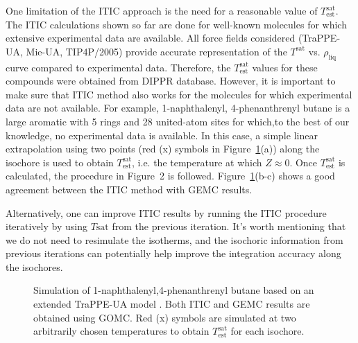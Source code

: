 \documentclass[5p,times]{elsarticle}
\begin{document}

One limitation of the ITIC approach is the need for a reasonable value of $T_\mathrm{est}^\mathrm{sat}$. The ITIC calculations shown so far are done for well-known molecules for which extensive experimental data are available. All force fields considered (TraPPE-UA, Mie-UA, TIP4P/2005) provide accurate representation of the $T^\mathrm{sat}$ vs. $\rho_\mathrm{liq}$ curve compared to experimental data. Therefore, the $T_\mathrm{est}^\mathrm{sat}$ values for these compounds were obtained from DIPPR database. However, it is important to make sure that ITIC method also works for the molecules for which experimental data are not available. For example, 1-naphthalenyl, 4-phenanthrenyl butane is a large aromatic with 5 rings and 28 united-atom sites for which,to the best of our knowledge, no experimental data is available. In this case, a simple linear extrapolation using two points (red (x) symbols in Figure~\ref{fig:Ex_Sim_TraPPE-1p4nB}(a)) along the isochore is used to obtain $T_\mathrm{est}^\mathrm{sat}$, i.e. the temperature at which $Z\approx0$. Once $T_\mathrm{est}^\mathrm{sat}$ is calculated, the procedure in Figure~2 is followed. Figure~\ref{fig:Ex_Sim_TraPPE-1p4nB}(b-c) shows a good agreement between the ITIC method with GEMC results.

Alternatively, one can improve ITIC results by running the ITIC procedure iteratively by using $T\mathrm{sat}$ from the previous iteration. It's worth mentioning that we do not need to resimulate the isotherms, and the isochoric information from previous iterations can potentially help improve the integration accuracy along the isochores. 



\begin{figure}[]
\centering
{}\label{cc}
\label{aa}
\label{bb}
\caption{
Simulation of 1-naphthalenyl,4-phenanthrenyl butane based on an extended TraPPE-UA model \cite{Yiannourakou2018}. Both ITIC and GEMC results are obtained using GOMC. Red (x) symbols are simulated at two arbitrarily chosen temperatures to obtain $T_\mathrm{est}^\mathrm{sat}$ for each isochore. 
}
\label{fig:Ex_Sim_TraPPE-1p4nB}
\end{figure}
\end{document}
